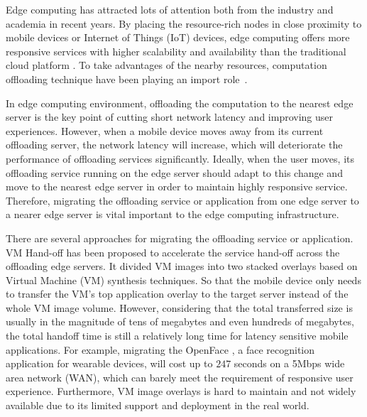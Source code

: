 
Edge computing has attracted lots of attention both from the industry and academia in recent years\cite{satya2009case,  MEC2014initiative, MEC2015-5G, yi2015fog,yi2015survey,shi2016edge,chiang2016fog,satya2017edge}.
By placing the resource-rich nodes in close proximity to mobile devices or Internet of Things (IoT) devices, edge computing offers more responsive services with higher scalability and availability than the traditional cloud platform \cite{MEC2014initiative,satya2017edge}.
To take advantages of the nearby resources, computation offloading technique have been playing an import role~\cite{cuervo2010maui,lane2016deepx,openface2016,liu2016paradrop}.

In edge computing environment, offloading the computation to the nearest edge server is the key point of cutting short network latency and improving user experiences. 
However, when a mobile device moves away from its current offloading server, the network latency will increase, which will deteriorate the performance of offloading services significantly. Ideally, when the user moves, its offloading service running on the edge server should adapt to this change and move to the nearest edge server in order to maintain highly responsive service. 
Therefore, migrating the offloading service or application from one edge server to a nearer edge server is vital important to the edge computing infrastructure. 

There are several approaches for migrating the offloading service or application. 
VM Hand-off \cite{ha2015vmhandoff} has been proposed to accelerate the service hand-off across the offloading edge servers. It divided VM images into two stacked overlays based on Virtual Machine (VM) synthesis \cite{satya2009case} techniques. 
So that the mobile device only needs to transfer the VM's top application overlay to the target server instead of the whole VM image volume. However, considering that the total transferred size is usually in the magnitude of tens of megabytes and even hundreds of megabytes, the total handoff time is still a relatively long time for latency sensitive mobile applications. For example, migrating the OpenFace \cite{openface2016}, a face recognition application for wearable devices, will cost up to $247$ seconds on a 5Mbps wide area network (WAN), which can barely meet the requirement of responsive user experience. 
Furthermore, VM image overlays is hard to maintain and not widely available due to its limited support and deployment in the real world.

